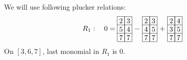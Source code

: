 {We will use following plucker relations:
\begin{align*}
{\def\lr#1{\multicolumn{1}{|@{\hspace{.6ex}}c@{\hspace{.6ex}}|}{\raisebox{-.3ex}{$#1$}}}
\raisebox{-.6ex}{$R_1 :\ \ \ 0 = \begin{array}[c]{*{2}c}\cline{1-2}
\lr{2}&\lr{3}\\\cline{1-2}
\lr{5}&\lr{4}\\\cline{1-2}
\lr{7}&\lr{7}\\\cline{1-2}
\end{array}$}
}
{\def\lr#1{\multicolumn{1}{|@{\hspace{.6ex}}c@{\hspace{.6ex}}|}{\raisebox{-.3ex}{$#1$}}}
\raisebox{-.6ex}{$\ -\ \begin{array}[c]{*{2}c}\cline{1-2}
\lr{2}&\lr{3}\\\cline{1-2}
\lr{4}&\lr{5}\\\cline{1-2}
\lr{7}&\lr{7}\\\cline{1-2}
\end{array}$}
}
{\def\lr#1{\multicolumn{1}{|@{\hspace{.6ex}}c@{\hspace{.6ex}}|}{\raisebox{-.3ex}{$#1$}}}
\raisebox{-.6ex}{$\ +\ \begin{array}[c]{*{2}c}\cline{1-2}
\lr{2}&\lr{4}\\\cline{1-2}
\lr{3}&\lr{5}\\\cline{1-2}
\lr{7}&\lr{7}\\\cline{1-2}
\end{array}$}
}\\
\end{align*}
On \([3,6,7]\), last monomial in \(R_1\) is \(0\).

}
